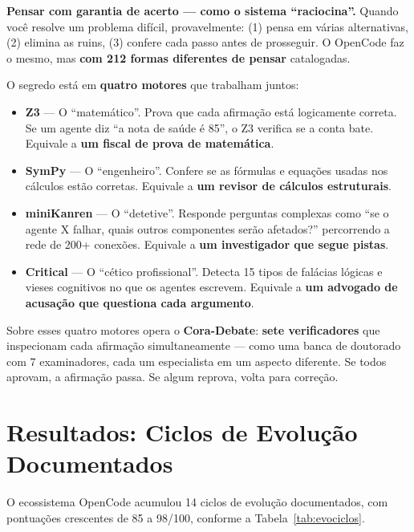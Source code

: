 \documentclass[
  article,
  12pt,
  oneside,
  a4paper,
  brazil,
  sumario=tradicional
]{abntex2}
\begin{document}
\begin{leigosbox}
\textbf{Pensar com garantia de acerto --- como o sistema ``raciocina''.} Quando você resolve um problema difícil, provavelmente: (1) pensa em várias alternativas, (2) elimina as ruins, (3) confere cada passo antes de prosseguir. O OpenCode faz o mesmo, mas \textbf{com 212 formas diferentes de pensar} catalogadas.

O segredo está em \textbf{quatro motores} que trabalham juntos:
\begin{itemize}
\item \textbf{Z3} --- O ``matemático''. Prova que cada afirmação está logicamente correta. Se um agente diz ``a nota de saúde é 85'', o Z3 verifica se a conta bate. Equivale a \textbf{um fiscal de prova de matemática}.
\item \textbf{SymPy} --- O ``engenheiro''. Confere se as fórmulas e equações usadas nos cálculos estão corretas. Equivale a \textbf{um revisor de cálculos estruturais}.
\item \textbf{miniKanren} --- O ``detetive''. Responde perguntas complexas como ``se o agente X falhar, quais outros componentes serão afetados?'' percorrendo a rede de 200+ conexões. Equivale a \textbf{um investigador que segue pistas}.
\item \textbf{Critical} --- O ``cético profissional''. Detecta 15 tipos de falácias lógicas e vieses cognitivos no que os agentes escrevem. Equivale a \textbf{um advogado de acusação que questiona cada argumento}.
\end{itemize}

\noindent Sobre esses quatro motores opera o \textbf{Cora-Debate}: \textbf{sete verificadores} que inspecionam cada afirmação simultaneamente --- como uma banca de doutorado com 7 examinadores, cada um especialista em um aspecto diferente. Se todos aprovam, a afirmação passa. Se algum reprova, volta para correção.
\end{leigosbox}

\section{Resultados: Ciclos de Evolução Documentados}

O ecossistema OpenCode acumulou 14 ciclos de evolução documentados, com pontuações crescentes de 85 a 98/100, conforme a Tabela~\ref{tab:evociclos}.
\end{document}
